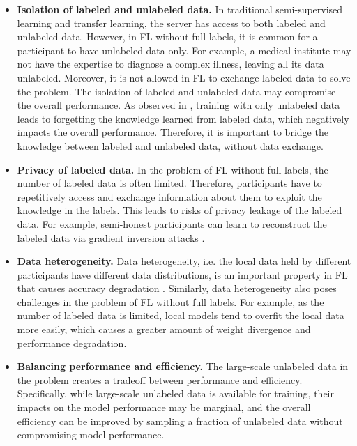 \documentclass[11pt]{article}
\begin{document}
\begin{itemize}
    \item \textbf{Isolation of labeled and unlabeled data.} In traditional semi-supervised learning and transfer learning, the server has access to both labeled and unlabeled data. However, in FL without full labels, it is common for a participant to have unlabeled data only. For example, a medical institute may not have the expertise to diagnose a complex illness, leaving all its data unlabeled. Moreover, it is not allowed in FL to exchange labeled data to solve the problem. The isolation of labeled and unlabeled data may compromise the overall performance. As observed in \cite{diao2022semifl,jeong2021federated}, training with only unlabeled data leads to forgetting the knowledge learned from labeled data, which negatively impacts the overall performance. Therefore, it is important to bridge the knowledge between labeled and unlabeled data, without data exchange. 
    \item \textbf{Privacy of labeled data.} In the problem of FL without full labels, the number of labeled data is often limited. Therefore, participants have to repetitively access and exchange information about them to exploit the knowledge in the labels. This leads to risks of privacy leakage of the labeled data. For example, semi-honest participants can learn to reconstruct the labeled data via gradient inversion attacks \cite{geiping2020inverting}.
    \item \textbf{Data heterogeneity.} Data heterogeneity, i.e. the local data held by different participants have different data distributions, is an important property in FL that causes accuracy degradation \cite{li2020federated,lai2021oort}. Similarly, data heterogeneity also poses challenges in the problem of FL without full labels. For example, as the number of labeled data is limited, local models tend to overfit the local data more easily, which causes a greater amount of weight divergence \cite{zhao2018federated} and performance degradation. 
    \item \textbf{Balancing performance and efficiency.} The large-scale unlabeled data in the problem creates a tradeoff between performance and efficiency. Specifically, while large-scale unlabeled data is available for training, their impacts on the model performance may be marginal, and the overall efficiency can be improved by sampling a fraction of unlabeled data without compromising model performance. 
\end{itemize}
\end{document}
